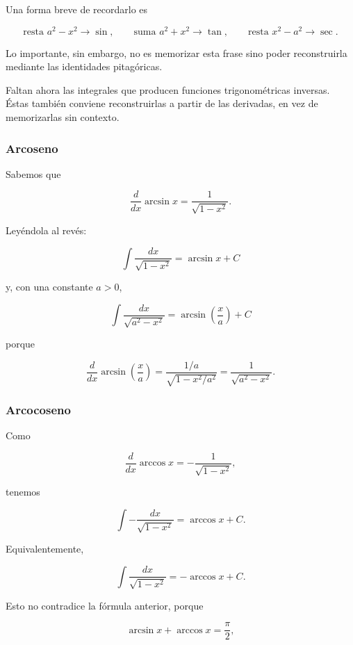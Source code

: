 Una forma breve de recordarlo es

\[
\boxed{
\text{resta }a^2-x^2\longrightarrow\sin,
\qquad
\text{suma }a^2+x^2\longrightarrow\tan,
\qquad
\text{resta }x^2-a^2\longrightarrow\sec.}
\]

Lo importante, sin embargo, no es memorizar esta frase sino poder reconstruirla
mediante las identidades pitagóricas.

Faltan ahora las integrales que producen funciones trigonométricas
inversas. Éstas también conviene reconstruirlas a partir de las
derivadas, en vez de memorizarlas sin contexto.

\subsubsection*{Arcoseno}

Sabemos que

\[
\frac{d}{dx}\arcsin x
=
\frac{1}{\sqrt{1-x^2}}.
\]

Leyéndola al revés:

\[
\boxed{
\int\frac{dx}{\sqrt{1-x^2}}
=
\arcsin x+C
}
\]

y, con una constante \(a>0\),

\[
\boxed{
\int\frac{dx}{\sqrt{a^2-x^2}}
=
\arcsin\left(\frac{x}{a}\right)+C
}
\]

porque

\[
\frac{d}{dx}
\arcsin\left(\frac{x}{a}\right)
=
\frac{1/a}{\sqrt{1-x^2/a^2}}
=
\frac{1}{\sqrt{a^2-x^2}}.
\]

\subsubsection*{Arcocoseno}

Como

\[
\frac{d}{dx}\arccos x
=
-\frac{1}{\sqrt{1-x^2}},
\]

tenemos

\[
\boxed{
\int-\frac{dx}{\sqrt{1-x^2}}
=
\arccos x+C
}.
\]

Equivalentemente,

\[
\int\frac{dx}{\sqrt{1-x^2}}
=
-\arccos x+C.
\]

Esto no contradice la fórmula anterior, porque

\[
\arcsin x+\arccos x=\frac{\pi}{2},
\]

